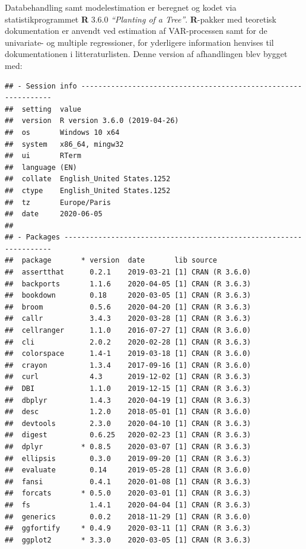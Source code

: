 \documentclass[
  a4paper,
  oneside]{memoir}
\begin{document}
Databehandling samt modelestimation er beregnet og kodet via statistikprogrammet \textbf{R} 3.6.0 \emph{``Planting of a Tree''}. \textbf{R}-pakker med teoretisk dokumentation er anvendt ved estimation af VAR-processen samt for de univariate- og multiple regressioner, for yderligere information henvises til dokumentationen i litteraturlisten. Denne version af afhandlingen blev bygget med:

\begin{verbatim}
## - Session info ---------------------------------------------------------------
##  setting  value                       
##  version  R version 3.6.0 (2019-04-26)
##  os       Windows 10 x64              
##  system   x86_64, mingw32             
##  ui       RTerm                       
##  language (EN)                        
##  collate  English_United States.1252  
##  ctype    English_United States.1252  
##  tz       Europe/Paris                
##  date     2020-06-05                  
## 
## - Packages -------------------------------------------------------------------
##  package       * version  date       lib source           
##  assertthat      0.2.1    2019-03-21 [1] CRAN (R 3.6.0)   
##  backports       1.1.6    2020-04-05 [1] CRAN (R 3.6.3)   
##  bookdown        0.18     2020-03-05 [1] CRAN (R 3.6.3)   
##  broom           0.5.6    2020-04-20 [1] CRAN (R 3.6.3)   
##  callr           3.4.3    2020-03-28 [1] CRAN (R 3.6.3)   
##  cellranger      1.1.0    2016-07-27 [1] CRAN (R 3.6.0)   
##  cli             2.0.2    2020-02-28 [1] CRAN (R 3.6.3)   
##  colorspace      1.4-1    2019-03-18 [1] CRAN (R 3.6.0)   
##  crayon          1.3.4    2017-09-16 [1] CRAN (R 3.6.0)   
##  curl            4.3      2019-12-02 [1] CRAN (R 3.6.3)   
##  DBI             1.1.0    2019-12-15 [1] CRAN (R 3.6.3)   
##  dbplyr          1.4.3    2020-04-19 [1] CRAN (R 3.6.3)   
##  desc            1.2.0    2018-05-01 [1] CRAN (R 3.6.0)   
##  devtools        2.3.0    2020-04-10 [1] CRAN (R 3.6.3)   
##  digest          0.6.25   2020-02-23 [1] CRAN (R 3.6.3)   
##  dplyr         * 0.8.5    2020-03-07 [1] CRAN (R 3.6.3)   
##  ellipsis        0.3.0    2019-09-20 [1] CRAN (R 3.6.3)   
##  evaluate        0.14     2019-05-28 [1] CRAN (R 3.6.0)   
##  fansi           0.4.1    2020-01-08 [1] CRAN (R 3.6.3)   
##  forcats       * 0.5.0    2020-03-01 [1] CRAN (R 3.6.3)   
##  fs              1.4.1    2020-04-04 [1] CRAN (R 3.6.3)   
##  generics        0.0.2    2018-11-29 [1] CRAN (R 3.6.0)   
##  ggfortify     * 0.4.9    2020-03-11 [1] CRAN (R 3.6.3)   
##  ggplot2       * 3.3.0    2020-03-05 [1] CRAN (R 3.6.3)   

\end{verbatim}
\end{document}
